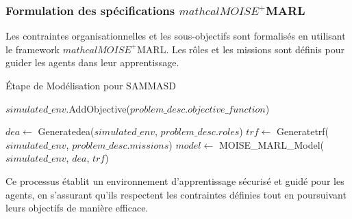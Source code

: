 \documentclass[sigconf,anonymous]{aamas}
\begin{document}
\subsubsection{Formulation des spécifications $mathcal{M}OISE^+$MARL}

Les contraintes organisationnelles et les sous-objectifs sont formalisés en utilisant le framework $mathcal{M}OISE^+$MARL. Les rôles et les missions sont définis pour guider les agents dans leur apprentissage.





\begin{algorithm}[hbt!]
  \caption{Étape de Modélisation pour SAMMASD}\label{alg:modeling}

  \SetAlgoLined
{}


$simulated\_env$.AddObjective($problem\_desc.objective\_function$)\;

$dea \gets$ Generatedea($simulated\_env$, $problem\_desc.roles$)\;
$trf \gets$ Generatetrf($simulated\_env$, $problem\_desc.missions$)\;
$model \gets$ MOISE\_MARL\_Model($simulated\_env$, $dea$, $trf$)\;


\end{algorithm}


Ce processus établit un environnement d'apprentissage sécurisé et guidé pour les agents, en s'assurant qu'ils respectent les contraintes définies tout en poursuivant leurs objectifs de manière efficace.
\end{document}
